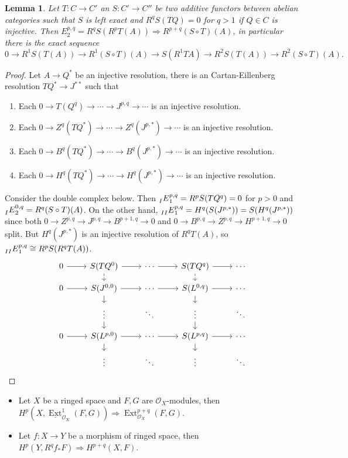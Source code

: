 \documentclass[leqno]{amsart}
\newcommand{\1}{\mathbf{1}}
\DeclareMathOperator{\Ext}{Ext}
\newtheorem{lem}[thm]{Lemma}
\theoremstyle{definition}
\theoremstyle{remark}
\begin{document}
\begin{lem}
	Let $T\colon C\to C'$ an $S\colon C'\to C''$
	be two additive functors between abelian categories
	such that $S$ is left exact 
	and $R^qS(TQ)=0$ for $q>1$ if $Q\in C$ is injective.
	Then $E^{p,q}_2=R^qS(R^pT(A))\Longrightarrow 
	R^{p+q}(S\circ T)(A)$, in particular
	there is the exact sequence
	\[
		0\to R^1S(T(A))\to R^1(S\circ T)(A)\to 
		S(R^1TA)\to R^2S(T(A))\to R^2(S\circ T)(A).
	\]
\end{lem}
\begin{proof}
	Let $A\to Q^*$ be an injective resolution,
	there is an Cartan-Eillenberg resolution
	$TQ^*\to J^{**}$ such that 
	\begin{enumerate}[label=(\alph*)]
	\item Each  
	$0\to T(Q^q)\to \cdots\to J^{p,q}\to\cdots$ 
	is an injective resolution.
	\item Each  
	$0\to Z^q(TQ^*)\to \cdots\to Z^q(J^{p,*})\to\cdots$ 
	is an injective resolution.
	\item Each  
	$0\to B^q(TQ^*)\to \cdots\to B^q(J^{p,*})\to\cdots$ 
	is an injective resolution.
	\item Each  
	$0\to H^q(TQ^*)\to \cdots\to H^q(J^{p,*})\to\cdots$ 
	is an injective resolution.
	\end{enumerate}
	Consider the double complex below.
	Then $\prescript{}{I}{E}_1^{p,q}=R^pS(TQ^q)=0$ for $p>0$
	and $\prescript{}{I}{E}_2^{0,q}=R^q(S\circ T)(A)$. 
	On the other hand, 
	$\prescript{}{II}{E}_1^{p,q}=H^q(S(J^{p,*}))=S(H^q(J^{p,*}))$
	since both
	$0\to Z^{p,q}\to J^{p,q}\to B^{p+1,q}\to 0$ and
	$0\to B^{p,q}\to Z^{p,q}\to H^{p+1,q}\to 0$ split.
	But $H^q(J^{p,*})$ is an injective resolution of $R^qT(A)$,
	so  $\prescript{}{II}{E}_1^{p,q}\cong R^pS(R^qT(A))$.
\[
\begin{tikzcd}[row sep=small]
	0 \arrow[r] &
	S(TQ^0) \arrow[r]\arrow[d,dashed] & \cdots \arrow[r]&
	S(TQ^q)\arrow[r]\arrow[d,dashed] & \cdots \\
	0 \arrow[r] &
	S(J^{0,0}) \arrow[r]\arrow[d] & \cdots \arrow[r]&
	S(L^{0,q}) \arrow[r]\arrow[d] & \cdots \\
	&
	\vdots \arrow[d]& \ddots&
	\vdots \arrow[d]& \ddots \\
	0 \arrow[r] &
	S(L^{p,0}) \arrow[r]\arrow[d] & \cdots \arrow[r]&
	S(L^{p,q}) \arrow[r]\arrow[d] & \cdots \\
	&
	\vdots & \ddots&
	\vdots & \ddots 
\end{tikzcd}
\]
\end{proof}
\begin{itemize}
	\item Let $X$ be a ringed space 
	and $F,G$ are $\mathcal{O}_X$-modules, then
	$H^p(X,\underline{\Ext}^1_{\mathcal{O}_X}(F,G))
	\Longrightarrow \Ext^{p+q}_{\mathcal{O}_X}(F,G)$.
	\item Let $f\colon X\to Y$ be a morphism of ringed space,
	then $H^p(Y, R^qf_*F)\Longrightarrow H^{p+q}(X,F)$.
\end{itemize}
\end{document}
